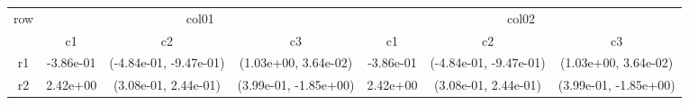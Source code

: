 \begin{tabular}{ccccccc}
\toprule
\multirow{2}{*}{row}&\multicolumn{3}{c}{col01}&\multicolumn{3}{c}{col02}\tabularnewline
\cmidrule(lr){2-4}
\cmidrule(lr){5-7}
&c1&c2&c3&c1&c2&c3\tabularnewline
\midrule
r1&-3.86e-01& (-4.84e-01, -9.47e-01)& (1.03e+00, 3.64e-02)&-3.86e-01& (-4.84e-01, -9.47e-01)& (1.03e+00, 3.64e-02)\tabularnewline
r2&2.42e+00& (3.08e-01, 2.44e-01)& (3.99e-01, -1.85e+00)&2.42e+00& (3.08e-01, 2.44e-01)& (3.99e-01, -1.85e+00)\tabularnewline
\bottomrule
\end{tabular}
